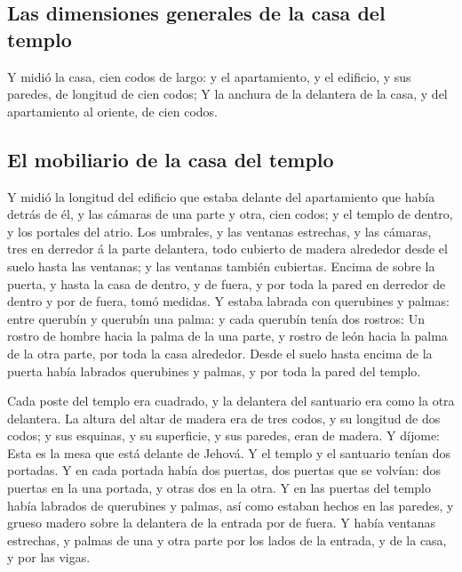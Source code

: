 \hypertarget{las-dimensiones-generales-de-la-casa-del-templo}{%
\subsection{Las dimensiones generales de la casa del
templo}\label{las-dimensiones-generales-de-la-casa-del-templo}}

 Y midió la casa, cien codos de largo: y el apartamiento,
y el edificio, y sus paredes, de longitud de cien codos; 
Y la anchura de la delantera de la casa, y del apartamiento al oriente,
de cien codos.

\hypertarget{el-mobiliario-de-la-casa-del-templo}{%
\subsection{El mobiliario de la casa del
templo}\label{el-mobiliario-de-la-casa-del-templo}}

 Y midió la longitud del edificio que estaba delante del
apartamiento que había detrás de él, y las cámaras de una parte y otra,
cien codos; y el templo de dentro, y los portales del atrio.
 Los umbrales, y las ventanas estrechas, y las cámaras,
tres en derredor á la parte delantera, todo cubierto de madera alrededor
desde el suelo hasta las ventanas; y las ventanas también cubiertas.
 Encima de sobre la puerta, y hasta la casa de dentro, y
de fuera, y por toda la pared en derredor de dentro y por de fuera, tomó
medidas.  Y estaba labrada con querubines y palmas: entre
querubín y querubín una palma: y cada querubín tenía dos rostros:
 Un rostro de hombre hacia la palma de la una parte, y
rostro de león hacia la palma de la otra parte, por toda la casa
alrededor.  Desde el suelo hasta encima de la puerta
había labrados querubines y palmas, y por toda la pared del templo.

 Cada poste del templo era cuadrado, y la delantera del
santuario era como la otra delantera.  La altura del
altar de madera era de tres codos, y su longitud de dos codos; y sus
esquinas, y su superficie, y sus paredes, eran de madera. Y díjome: Esta
es la mesa que está delante de Jehová.  Y el templo y el
santuario tenían dos portadas.  Y en cada portada había
dos puertas, dos puertas que se volvían: dos puertas en la una portada,
y otras dos en la otra.  Y en las puertas del templo
había labrados de querubines y palmas, así como estaban hechos en las
paredes, y grueso madero sobre la delantera de la entrada por de fuera.
 Y había ventanas estrechas, y palmas de una y otra parte
por los lados de la entrada, y de la casa, y por las vigas.

